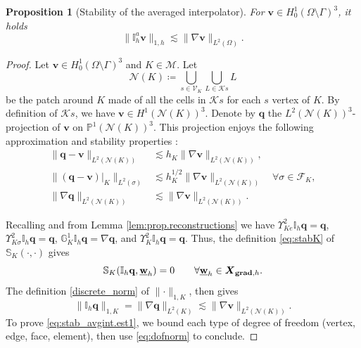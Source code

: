 \documentclass[a4paper,11pt]{article}
\newtheorem{prop}[theorem]{Proposition}
\theoremstyle{definition}
\theoremstyle{remark}
\newcommand{\uvec}[1]{\underline{\mathbf{#1}}}
\newcommand{\bo}[1]{\mathbf{#1}}
\newcommand{\up}[1]{\Upsilon^2_{#1}}
\newcommand{\dgr}[1]{\mathbb G^1_{#1}}
\newcommand{\mI}[1]{\mathbb I_h\bo{#1}}
\def\cF{\mathcal{F}}
\def\cK{\mathcal{K}}
\def\cM{\mathcal{M}}
\def\cN{\mathcal{N}}
\def\cV{\mathcal{V}}
\def\dgs{\boldsymbol{X}_{{\bf grad},h}}
\def\O{\Omega}
\begin{document}
\begin{prop}[Stability of the averaged interpolator]\label{prop:stab.avginter}
For $\bo{v}\in H^1_0(\O\setminus{\Gamma})^3$, it holds
\begin{equation}\label{eq:stab_avgint.est1}
  \lVert \mathbb I^{a}_h\bo{v}\rVert_{1,h}\lesssim \lVert\nabla\bo{v}\rVert_{L^2(\O)}.
\end{equation}
\end{prop}
\begin{proof}
Let $\bo{v}\in H^1_0(\O\setminus{\Gamma})^3$ and $K\in\cM$. Let 
$$
  \cN(K)\coloneqq \bigcup\limits_{s\in\cV_K}\bigcup\limits_{L\in\cK s}L
$$
be the patch around $K$ made of all the cells in $\cK s$ for each $s$ vertex of $K$. By definition of $\cK s$, we have $\bo{v}\in H^1(\cN(K))^3$. Denote by $\bo{q}$ the $L^2(\cN(K))^3$-projection of $\bo{v}$ on $\mathbb P^1(\cN(K))^3$. This projection enjoys the following approximation and stability properties \cite[Theorem 1.45]{hho-book}:
\begin{align}
\lVert \bo{q}-\bo{v}\rVert_{L^2(\cN(K))}&\lesssim h_K\lVert \nabla \bo{v}\rVert_{L^2(\cN(K))},\label{eq:stab_avgint.est2}\\
\lVert (\bo{q}-\bo{v})|_K\rVert_{L^2(\sigma)}&\lesssim h^{1/2}_K\lVert \nabla \bo{v}\rVert_{L^2(\cN(K))}\quad\forall\sigma\in\cF_K,\label{eq:stab_avgint.est3}\\
\lVert \nabla \bo{q}\rVert_{L^2(\cN(K))}&\lesssim \lVert \nabla \bo{v}\rVert_{L^2(\cN(K))}.\label{eq:stab_avgint.est4}
\end{align}

Recalling \cite[Lemma 3]{pjddr} and from Lemma \ref{lem:prop.reconstructions} we have $\up{Ke}\mathbb I_h\bo{q}=\bo{q}$, $\up{K\sigma}\mathbb I_h\bo{q}=\bo{q}$,  $\dgr{K}\mathbb I_h\bo{q}=\nabla \bo{q}$, and $\up{K}\mathbb I_h\bo{q}=\bo{q}$.
Thus, the definition \eqref{eq:stabK} of $\mathbb S_K(\cdot,\cdot)$ gives
\begin{equation}\label{eq:stab.consistency}
\mathbb S_K(\mathbb I_h\bo{q},\uvec{w}_h)=0\qquad\forall\uvec{w}_h\in\dgs.
\end{equation}
The definition \eqref{discrete_norm} of $\lVert \cdot\rVert_{1,K}$, then gives
\begin{equation}\label{eq:stab_avgint.est5}
\lVert \mI{q}\rVert_{1,K}=\lVert \nabla\bo{q}\rVert_{L^2(K)}\lesssim \lVert\nabla \bo{v}\rVert_{L^2(\cN(K))}.
\end{equation}
To prove \eqref{eq:stab_avgint.est1}, we bound each type of degree of freedom (vertex, edge, face, element), then use \eqref{eq:dofnorm} to conclude.


\end{proof}
\end{document}
